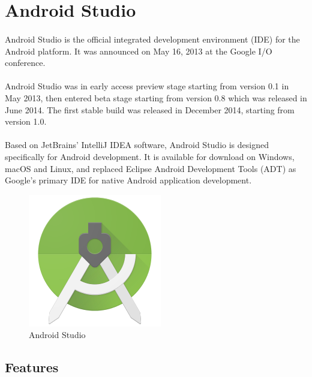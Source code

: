 \documentclass[a4paper,12pt]{report}
\begin{document}
\section{Android Studio}
\paragraph{}Android Studio is the official integrated development environment (IDE) for the Android platform. It was announced on May 16, 2013 at the Google I/O conference.
\paragraph{}Android Studio was in early access preview stage starting from version 0.1 in May 2013, then entered beta stage starting from version 0.8 which was released in June 2014. The first stable build was released in December 2014, starting from version 1.0. 
\paragraph{}Based on JetBrains' IntelliJ IDEA software, Android Studio is designed specifically for Android development. It is available for download on Windows, macOS and Linux, and replaced Eclipse Android Development Tools (ADT) as Google's primary IDE for native Android application development.
\begin{figure}[!h]
	\begin{center}
		\includegraphics[width=.5\textwidth]{as.png}    
		\caption{Android Studio}
		\label{fig2}
	\end{center}
\end{figure}
\subsection{Features}
\end{document}
